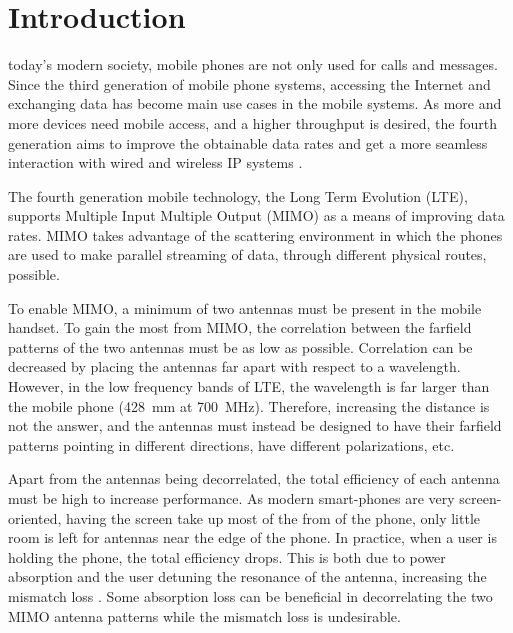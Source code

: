\section{Introduction}
\label{sec:introduction}

 today's modern society, mobile phones are not only used for calls and messages. Since the third generation of mobile phone systems, accessing the Internet and exchanging data has become main use cases in the mobile systems. As more and more devices need mobile access, and a higher throughput is desired, the fourth generation aims to improve the obtainable data rates and get a more seamless interaction with wired and wireless IP systems \cite{tanenbaum2012computer}.

The fourth generation mobile technology, the Long Term Evolution (LTE),  supports Multiple Input Multiple Output (MIMO) as a means of improving data rates. MIMO takes advantage of the scattering environment in which the phones are used to make parallel streaming of data, through different physical routes, possible.

To enable MIMO, a minimum of two antennas must be present in the mobile handset. To gain the most from MIMO, the correlation between the farfield patterns of the two antennas must be as low as possible. Correlation can be decreased by placing the antennas far apart with respect to a wavelength. However, in the low frequency bands of LTE, the wavelength is far larger than the mobile phone (\SI{428}{mm} at \SI{700}{MHz}). Therefore, increasing the distance is not the answer, and the antennas must instead be designed to have their farfield patterns pointing in different directions, have different polarizations, etc.

Apart from the antennas being decorrelated, the total efficiency of each antenna must be high to increase performance. As modern smart-phones are very screen-oriented, having the screen take up most of the from of the phone, only little room is left for antennas near the edge of the phone. In practice, when a user is holding the phone, the total efficiency drops. This is both due to power absorption and the user detuning the resonance of the antenna, increasing the mismatch loss \cite{Samantha2014UserEff}. Some absorption loss can be beneficial in decorrelating the two MIMO antenna patterns \cite{Samantha2014UserEff} while the mismatch loss is undesirable.

